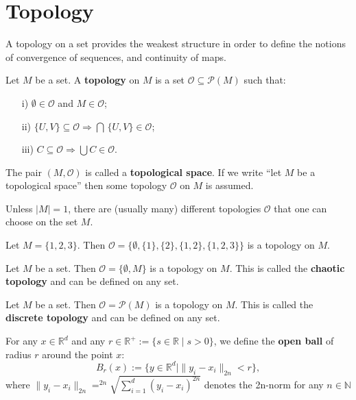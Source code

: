 \documentclass[root.tex]{subfiles}
\begin{document}
\section{Topology}

A topology on a set provides the weakest structure in order to define the notions of convergence of sequences, and continuity of maps. 

\begin{mydef}
  Let $M$ be a set. A \textbf{topology} on $M$ is a set $\mathcal{O} \subseteq \mathcal{P}(M)$ such that:
\begin{enumerate}
\item[i)] $\emptyset \in \mathcal{O}$ and $M \in \mathcal{O}$;
\item[ii)] $\{U,V\}\subseteq \mathcal{O} \Rightarrow \bigcap\, \{U,V\} \in \mathcal{O}$;
\item[iii)] $C \subseteq \mathcal{O} \Rightarrow \bigcup C \in \mathcal{O}$.
\end{enumerate}

The pair $(M,\mathcal{O})$ is called a \textbf{topological space}. If we write ``let $M$ be a topological space'' then some topology $\mathcal{O}$ on $M$ is assumed.
\end{mydef}


\begin{remark}
Unless $|M|=1$, there are (usually many) different topologies $\mathcal{O}$ that one can choose on the set $M$.
\end{remark}

\begin{myex}
Let $M = \{1,2,3\}$. Then $\mathcal{O}=\{\emptyset,\{1\},\{2\},\{1,2\},\{1,2,3\}\}$ is a topology on $M$.
\end{myex}

\begin{myex}
Let $M$ be a set. Then $\mathcal{O}=\{\emptyset , M\}$ is a topology on $M$. This is called the \textbf{chaotic topology} and can be defined on any set.
\end{myex}

\begin{myex}
  Let $M$ be a set. Then $\mathcal{O}=\mathcal{P}(M)$ is a topology on $M$. This is called the \textbf{discrete topology} and can be defined on any set.
\end{myex}

\begin{mydef}
For any $x\in\mathbb{R}^d$ and any $r \in \mathbb{R}^+:=\{s\in\mathbb{R}\mid s>0\}$, we define the \textbf{open ball} of radius $r$ around the point $x$:
$$
B_r(x) := \bigl\{y\in \mathbb{R}^d \mid \|y_i-x_i\|_{2n} <r \bigr\},
$$
where $\|y_i-x_i\|_{2n}=^{2n}\sqrt{\sum_{i=1}^d (y_i-x_i)^{2n}}$ denotes the 2n-norm for any $n \in \mathbb{N}$ 
\end{mydef}
\end{document}
